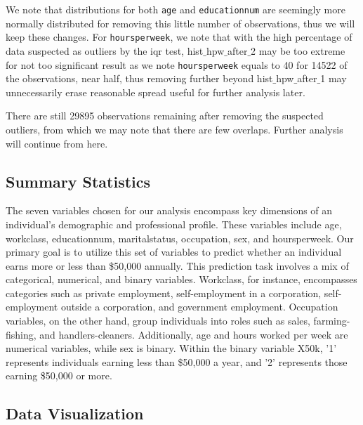 \documentclass{article}
\begin{document}
    We note that distributions for both \texttt{age} and \texttt{educationnum} are seemingly more normally distributed for removing this little number of observations, thus we will keep these changes. For \texttt{hoursperweek}, we note that with the high percentage of data suspected as outliers by the iqr test, hist$\_$hpw$\_$after$\_$2 may be too extreme for not too significant result as we note \texttt{hoursperweek} equals to 40 for 14522 of the observations, near half, thus removing further beyond hist$\_$hpw$\_$after$\_$1 may unnecessarily erase reasonable spread useful for further analysis later.  

    There are still 29895 observations remaining after removing the suspected outliers, from which we may note that there are few overlaps. Further analysis will continue from here.
    
    \subsection{Summary Statistics}
    \hspace{\parindent} 

The seven variables chosen for our analysis encompass key dimensions of an individual's demographic and professional profile. These variables include age, workclass, educationnum, maritalstatus, occupation, sex, and hoursperweek. Our primary goal is to utilize this set of variables to predict whether an individual earns more or less than \$50,000 annually. This prediction task involves a mix of categorical, numerical, and binary variables. Workclass, for instance, encompasses categories such as private employment, self-employment in a corporation, self-employment outside a corporation, and government employment. Occupation variables, on the other hand, group individuals into roles such as sales, farming-fishing, and handlers-cleaners. Additionally, age and hours worked per week are numerical variables, while sex is binary. Within the binary variable X50k, '1' represents individuals earning less than \$50,000 a year, and '2' represents those earning \$50,000 or more.
    
    \subsection{Data Visualization}
    \hspace{\parindent} 
\end{document}
